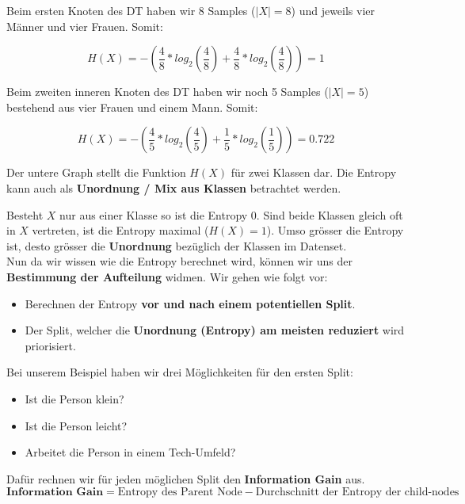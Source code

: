 Beim ersten Knoten des DT haben wir 8 Samples ($|X| = 8$) und jeweils vier Männer und vier Frauen. Somit:

$$ H(X) = -\left(\frac{4}{8} * log_{2}\left(\frac{4}{8}\right) + \frac{4}{8} * log_{2}\left(\frac{4}{8}\right)\right) = 1 $$


Beim zweiten inneren Knoten des DT haben wir noch 5 Samples ($|X| = 5$) bestehend aus vier Frauen und einem Mann. Somit:

$$ H(X) = -\left(\frac{4}{5} * log_{2}\left(\frac{4}{5}\right) + \frac{1}{5} * log_{2}\left(\frac{1}{5}\right)\right) = 0.722 $$



Der untere Graph stellt die Funktion $H(X)$ für zwei Klassen dar. Die  Entropy kann auch als \textbf{Unordnung / Mix aus Klassen} betrachtet werden.


Besteht $X$ nur aus einer Klasse so ist die Entropy 0. Sind beide Klassen gleich oft in $X$ vertreten, ist die Entropy maximal ($H(X) = 1$). Umso grösser die Entropy ist, desto grösser die \textbf{Unordnung} bezüglich der Klassen im Datenset.\\


Nun da wir wissen wie die Entropy berechnet wird, können wir uns der \textbf{Bestimmung der Aufteilung} widmen. Wir gehen wie folgt vor:

\begin{itemize}
	\item Berechnen der Entropy \textbf{vor und nach einem potentiellen Split}.
	\item Der Split, welcher die \textbf{Unordnung (Entropy) am meisten reduziert} wird priorisiert.
\end{itemize}


Bei unserem Beispiel haben wir drei Möglichkeiten für den ersten Split:
\begin{itemize}
	\item Ist die Person klein?
	\item Ist die Person leicht?
	\item Arbeitet die Person in einem Tech-Umfeld?
\end{itemize}
Dafür rechnen wir für jeden möglichen Split den \textbf{Information Gain} aus.
$$ \textbf{Information Gain} = \text{Entropy des Parent Node} - \text{Durchschnitt der Entropy der child-nodes} $$

